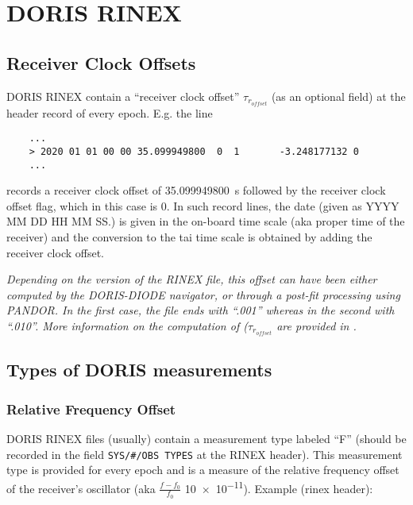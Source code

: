 \chapter{DORIS RINEX}
\label{ch:doris-rinex}

\section{Receiver Clock Offsets}

DORIS RINEX contain a ``receiver clock offset'' \(\tau_{r_{offset}}\) (as an 
optional field) at the header record of every epoch. E.g. the line
\begin{verbatim}
    ...
    > 2020 01 01 00 00 35.099949800  0  1       -3.248177132 0
    ...
\end{verbatim}
records a receiver clock offset of \SI{35.099949800}{\second} followed by the 
receiver clock offset flag, which in this case is \num{0}. In such record 
lines, the date (given as YYYY MM DD HH MM SS.) is given in the on-board time 
scale (aka proper time of the receiver) and the conversion to the \gls{tai} 
time scale is obtained by adding the receiver clock offset.

\textit{Depending on the version of the RINEX file, this offset can have been either 
computed by the DORIS-DIODE navigator, or through a post-fit processing using PANDOR. 
In the first case, the file ends with ``.001'' whereas in the second with ``.010''. 
More information on the computation of (\(\tau_{r_{offset}}\) are provided in 
\cite{lemoine-2016}.}

\section{Types of DORIS measurements}
\label{sec:types-of-doris-measurements}

\subsection{Relative Frequency Offset}
\label{ssec:relative-frequency-offset}

DORIS RINEX files (usually) contain a measurement type labeled ``F'' (should be 
recorded in the field \verb|SYS/#/OBS TYPES| at the RINEX header). This measurement 
type is provided for every epoch and is a measure of the relative frequency 
offset of the receiver's oscillator (aka \(\frac{f-f_0}{f_0}\) \num{10e-11}).
Example (rinex header):

